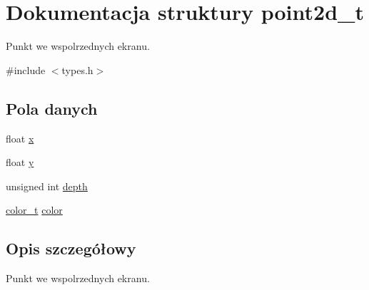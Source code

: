 \hypertarget{structpoint2d__t}{\section{Dokumentacja struktury point2d\-\_\-t}
\label{structpoint2d__t}
}


Punkt we wspolrzednych ekranu.  




{\ttfamily \#include $<$types.\-h$>$}

\subsection*{Pola danych}
\begin{DoxyCompactItemize}
\item 
float \hyperlink{structpoint2d__t_a6b52fbe1db413e6273a6e33c23158c2d}{x}
\item 
float \hyperlink{structpoint2d__t_acd589ab17f5cb77d50230c6246a1c671}{y}
\item 
unsigned int \hyperlink{structpoint2d__t_af0fd7ab7c8722d88a2fd64c2dd41e5e5}{depth}
\item 
\hyperlink{types_8h_af00bd69e44901f206becdb8e7cf0ff27}{color\-\_\-t} \hyperlink{structpoint2d__t_adab609377d70a908d71cc3475eb4c88f}{color}
\end{DoxyCompactItemize}


\subsection{Opis szczegółowy}
Punkt we wspolrzednych ekranu. 

